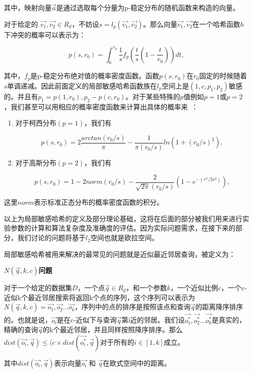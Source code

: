 其中，映射向量$ \vec{a} $是通过选取每个分量为p-稳定分布的随机函数来构造的向量。

对于给定的 $\vec{v_1},\vec{v_2} \in R_d$，不妨设$ s = l_p(\vec{v_1},\vec{v_2}) $。那么向量$ \vec{v_1},\vec{v_2} $在一个哈希函数$ h $下冲突的概率可以表示为：

\begin{equation}
p(s,r_0) = \int_{0}^{r_0}\frac{1}{s}f_p(\frac{t}{s}(1-\frac{t}{r_0}))dt, 
\end{equation}

其中，$ f_p $是p-稳定分布绝对值的概率密度函数。函数$ p(s,r_0) $在$ r_0 $固定的时候随着$ s $单调递减。因此前面定义的局部敏感哈希函数族在$ l_p $空间上是$ (1,c,p_1,p_2) $敏感的。并且有$ p_1 = p(1,r_0), p_2-p(c,r_0) $。对于某些特殊的$ p $值例如$ p=1 $或$ p=2 $，我们甚至可以用相应的概率密度函数来计算出具体的概率来~\cite{lazy18}：

\begin{enumerate}
	
	\item 对于柯西分布$ (p=1) $，我们有
	
	\begin{equation}
	p(s,r_0) = 2\frac{arctan(r_0/s)}{\pi} - \frac{1}{\pi(r_0/s)}ln(1+(r_0/s)^2),
	\end{equation}
	
	\item 对于高斯分布$ (p=2) $，我们有
	
	\begin{equation}
	\label{GaussPr} 
	p(s,r_0) = 1 - 2norm(r_0/s) - \frac{2}{\sqrt{2\pi}(r_0/s)}(1-e^{-(r^2/2s^2)}),
	\end{equation}
	
\end{enumerate}

这里$ norm $表示标准正态分布的概率密度函数的积分。

以上为局部敏感哈希的定义及部分理论基础，这将在后面的部分被我们用来进行实验参数的计算和算法复杂度及准确度的评估。因为实际问题需求，在接下来的部分，我们讨论的问题将基于$ l_2 $空间也就是欧拉空间。

局部敏感哈希被用来解决的最常见的问题就是近似最近邻居查询，被定义为：

\begin{definition}
	{\bf $ N(\vec{q},k,c) $问题}
	
	对于一个给定的数据集$ D $，一个点$ \vec{q} \in R_d $，和一个参数$ k $，一个近似比例$ c $，一个c-近似k个最近邻居搜索将返回k个点的序列，这个序列可以表示为$ N(\vec{q},k,c) = \vec{o_1},\vec{o_2}\dots\vec{o_k} $，序列中的点的排序是按照该点和查询$ \vec{q} $的距离降序排序的。也就是说，$ \vec{o_i} $是在c-近似下与查询$ \vec{q} $第i近的邻居。我们设$ \vec{o^*_1},\vec{o^*_2}\dots\vec{o^*_k} $是真实的，精确的查询$ \vec{q} $的k个最近邻居，并且同样按照降序排序。那么$ dist(\vec{o_i},\vec{q}) \le (c\times dist(\vec{o^*_i},\vec{q}) $对于所有的$ i \in [1,k] $成立。
	
	其中$ dist(\vec{o_i},\vec{q}) $表示向量$ \vec{o_i} $ 和 $ \vec{q} $在欧式空间中的距离。
	
\end{definition}

